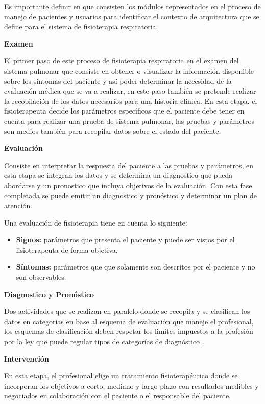 \documentclass[12pt]{article}
\begin{document}
Es importante definir en que consisten los módulos representados en el proceso de manejo de pacientes y usuarios para identificar el contexto de arquitectura que se define para el sistema de fisioterapia respiratoria.

\textbf{Examen}

El primer paso de este proceso de fisioterapia respiratoria en el examen del sistema pulmonar que consiste en obtener o visualizar la información disponible sobre los síntomas del paciente y así poder determinar la necesidad de la evaluación médica que se va a realizar, en este paso también se pretende realizar la recopilación de los datos necesarios para una historia clínica. En esta etapa, el fisioterapeuta decide los parámetros específicos que el paciente debe tener en cuenta para realizar una prueba de sistema pulmonar, las pruebas y parámetros son medios también para recopilar datos sobre el estado del paciente. 


\textbf{Evaluación}

Consiste en interpretar la respuesta del paciente a las pruebas y parámetros, en esta etapa se integran los datos y se determina un diagnostico que pueda abordarse y un pronostico que incluya objetivos de la evaluación. Con esta fase completada se puede emitir un diagnostico y pronóstico y determinar un plan de atención.

Una evaluación de fisioterapia tiene en cuenta lo siguiente:

\begin{itemize}
    \item \textbf{Signos:} parámetros que presenta el paciente y puede ser vistos por el fisioterapeuta de forma objetiva.
    \item \textbf{Síntomas:} parámetros que que solamente son descritos por el paciente y no son observables. 
\end{itemize}


\textbf{Diagnostico y Pronóstico}

Dos actividades que se realizan en paralelo donde se recopila y se clasifican los datos en categorías en base al esquema de evaluación que maneje el profesional, los esquemas de clasificación deben respetar los limites impuestos a la profesión por la ley que puede regular tipos de categorías de diagnóstico \cite{5}.


\textbf{Intervención}

En esta etapa, el profesional elige un tratamiento fisioterapéutico donde se incorporan los objetivos a corto, mediano y largo plazo con resultados medibles y negociados en colaboración con el paciente o el responsable del paciente\cite{27}. 
\end{document}

